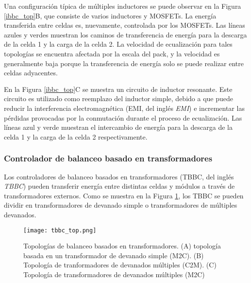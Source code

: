 Una configuraci\'on t\'ipica de m\'ultiples inductores se puede observar en la
Figura \ref{ibbc_top}B, que consiste de varios inductores y MOSFETs. La
energ\'ia transferida entre celdas es, nuevamente, controlada por los MOSFETs. 
Las líneas azules y verdes muestran los caminos de transferencia de 
energ\'ia para la descarga de la celda 1 y la carga de la celda 2. La velocidad 
de ecualizaci\'on para tales topolog\'ias se encuentra afectada por la escala 
del pack, y la velocidad es generalmente baja porque la transferencia de 
energ\'ia solo se puede realizar entre celdas adyacentes.

En la Figura \ref{ibbc_top}C se muestra un circuito de inductor resonante. Este
circuito es utilizado como reemplazo del inductor simple, debido a que puede
reducir la interferencia electromagn\'etica (\acrshort{EMI}, del ingl\'es
\emph{\acrlong{EMI}}) e incrementar las p\'erdidas provocadas por la
conmutaci\'on durante el proceso de ecualizaci\'on. Las líneas azul y verde
muestran el intercambio de energ\'ia para la descarga de la celda 1 y la carga
de la celda 2 respectivamente.

\subsubsection{Controlador de balanceo basado en transformadores}

Los controladores de balanceo basados en transformadores (\acrshort{TBBC}, del
ingl\'es \emph{\acrlong{TBBC}}) pueden transferir energ\'ia entre distintas celdas y
m\'odulos a trav\'es de transformadores externos. Como se muestra en la Figura
\ref{tbbc_top}, los \acrshort{TBBC} se pueden dividir en transformadores de
devanado simple o transformadores de m\'ultiples devanados.

\begin{figure}[h!]
    \begin{center}
        \texttt{[image: tbbc\_top.png]}
        \caption{Topolog\'ias de balanceo basados en transformadores. (A)
        topolog\'ia basada en un transformador de devanado simple
        (\acrshort{M2C}). (B) Topolog\'ia de tranformadores de devanados
        m\'ultiples (\acrshort{C2M}). (C) Topolog\'ia de transformadores de
        devanados m\'ultiples (\acrshort{M2C})}
        \label{tbbc_top}
    \end{center}
\end{figure}

